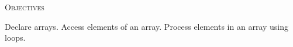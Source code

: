 
\textsc{Objectives}
 \begin{myenum}
   \li Declare arrays.
   \li Access elements of an array.
   \li Process elements in an array using loops.
 \end{myenum}
